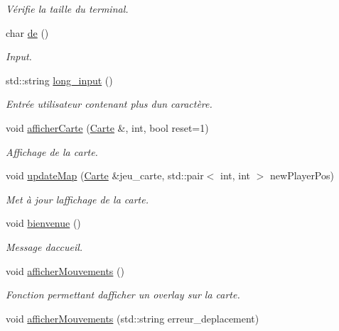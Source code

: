 \begin{DoxyCompactItemize}
\begin{DoxyCompactList}\small\item\em Vérifie la taille du terminal. \end{DoxyCompactList}\item 
char \hyperlink{namespaceio_ae9908b55f26f07e78043d7cfad003d22}{de} ()
\begin{DoxyCompactList}\small\item\em Input. \end{DoxyCompactList}\item 
std\+::string \hyperlink{namespaceio_ab044be3afd7ac04eeb1a496af0f1d5c6}{long\+\_\+input} ()
\begin{DoxyCompactList}\small\item\em Entrée utilisateur contenant plus d\textquotesingle{}un caractère. \end{DoxyCompactList}\item 
void \hyperlink{namespaceio_ad1c0f5f45e4ec19ee5dbc108314eacbc}{afficher\+Carte} (\hyperlink{class_carte}{Carte} \&, int, bool reset=1)
\begin{DoxyCompactList}\small\item\em Affichage de la carte. \end{DoxyCompactList}\item 
void \hyperlink{namespaceio_ae9438bfe8b2631be82b0f4d644358545}{update\+Map} (\hyperlink{class_carte}{Carte} \&jeu\+\_\+carte, std\+::pair$<$ int, int $>$ new\+Player\+Pos)
\begin{DoxyCompactList}\small\item\em Met à jour l\textquotesingle{}affichage de la carte. \end{DoxyCompactList}\item 
void \hyperlink{namespaceio_a7fdf85a0d766d2dcdb9870ae0458826a}{bienvenue} ()
\begin{DoxyCompactList}\small\item\em Message d\textquotesingle{}accueil. \end{DoxyCompactList}\item 
void \hyperlink{namespaceio_ac60b7c3503eb53e69a2adc86368ab633}{afficher\+Mouvements} ()
\begin{DoxyCompactList}\small\item\em Fonction permettant d\textquotesingle{}afficher un overlay sur la carte. \end{DoxyCompactList}\item 
void \hyperlink{namespaceio_a45e9ac702aa6ea62eeca96e921b8eaa1}{afficher\+Mouvements} (std\+::string erreur\+\_\+deplacement)

\end{DoxyCompactItemize}
